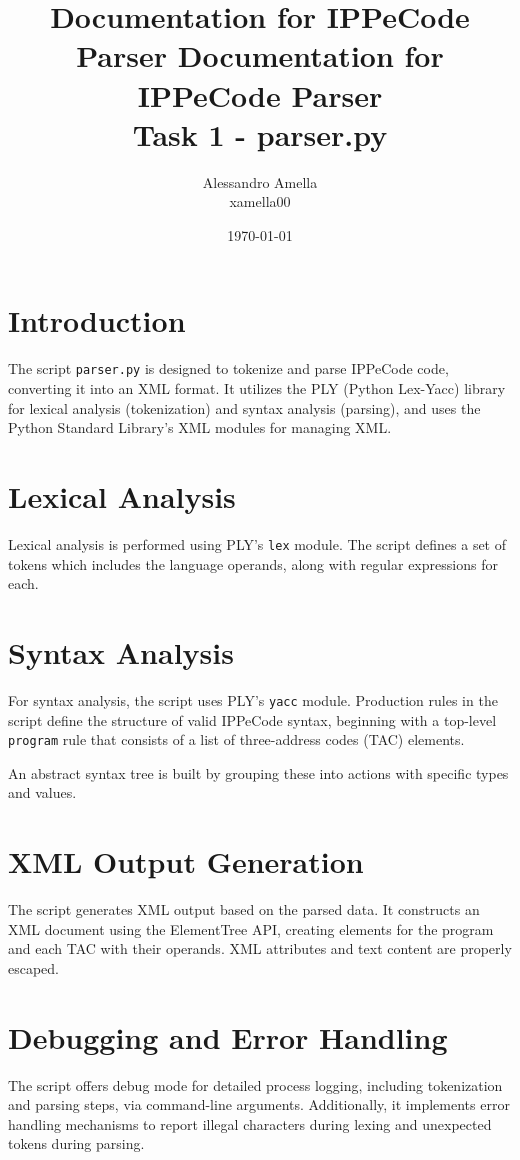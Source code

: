 \documentclass{article}
\title{Documentation for IPPeCode Parser}
\title{%
  Documentation for IPPeCode Parser \\
  \large Task 1 - parser.py}
\author{Alessandro Amella\\xamella00}
\date{\today}
\begin{document}
\maketitle

\section{Introduction}
The script \texttt{parser.py} is designed to tokenize and parse IPPeCode code, converting it into an XML format. It utilizes the PLY (Python Lex-Yacc) library for lexical analysis (tokenization) and syntax analysis (parsing), and uses the Python Standard Library's XML modules for managing XML.

\section{Lexical Analysis}
Lexical analysis is performed using PLY's \texttt{lex} module. The script defines a set of tokens which includes the language operands, along with regular expressions for each.

\section{Syntax Analysis}
For syntax analysis, the script uses PLY's \texttt{yacc} module. Production rules in the script define the structure of valid IPPeCode syntax, beginning with a top-level \texttt{program} rule that consists of a list of three-address codes (TAC) elements.

An abstract syntax tree is built by grouping these into actions with specific types and values.

\section{XML Output Generation}
The script generates XML output based on the parsed data. It constructs an XML document using the ElementTree API, creating elements for the program and each TAC with their operands. XML attributes and text content are properly escaped.

\section{Debugging and Error Handling}
The script offers debug mode for detailed process logging, including tokenization and parsing steps, via command-line arguments. Additionally, it implements error handling mechanisms to report illegal characters during lexing and unexpected tokens during parsing.
\end{document}
